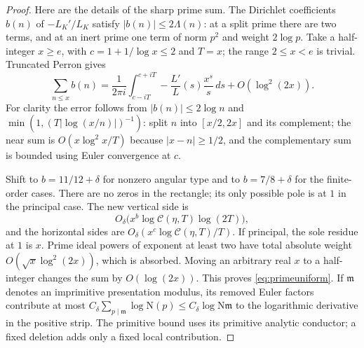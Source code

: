 \documentclass[11pt,a4paper]{article}
\numberwithin{equation}{section}
\theoremstyle{definition}
\theoremstyle{remark}
\newcommand{\N}{\mathrm N}
\newcommand{\dd}{\,d}
\begin{document}
\begin{proof}
Here are the details of the sharp prime sum. The Dirichlet coefficients $b(n)$ of $-L_K'/L_K$ satisfy $|b(n)|\le2\Lambda(n)$: at a split prime there are two terms, and at an inert prime one term of norm $p^2$ and weight $2\log p$. Take a half-integer $x\ge e$, with $c=1+1/\log x\le2$ and $T=x$; the range $2\le x<e$ is trivial. Truncated Perron gives
\[
 \sum_{n\le x}b(n)=\frac1{2\pi i}\int_{c-iT}^{c+iT}-\frac{L'}L(s)\frac{x^s}s\dd s+O(\log^2(2x)).
\]
For clarity the error follows from $|b(n)|\le2\log n$ and
$\min(1,(T|\log(x/n)|)^{-1})$: split $n$ into $[x/2,2x]$ and its complement; the near sum is $O(x\log^2x/T)$ because $|x-n|\ge1/2$, and the complementary sum is bounded using Euler convergence at $c$.

Shift to $b=11/12+\delta$ for nonzero angular type and to $b=7/8+\delta$ for the finite-order cases. There are no zeros in the rectangle; its only possible pole is at $1$ in the principal case. The new vertical side is
\[
 O_\delta\bigl(x^b\log\mathcal C(\eta,T)\log(2T)\bigr),
\]
and the horizontal sides are $O_\delta(x^c\log\mathcal C(\eta,T)/T)$. If principal, the sole residue at $1$ is $x$. Prime ideal powers of exponent at least two have total absolute weight $O(\sqrt x\log^2(2x))$, which is absorbed. Moving an arbitrary real $x$ to a half-integer changes the sum by $O(\log(2x))$. This proves \eqref{eq:primeuniform}. If $\mathfrak m$ denotes an imprimitive presentation modulus, its removed Euler factors contribute at most $C_\delta\sum_{p\mid\mathfrak m}\log\N(p)\le C_\delta\log\N\mathfrak m$ to the logarithmic derivative in the positive strip. The primitive bound uses its primitive analytic conductor; a fixed deletion adds only a fixed local contribution.
\end{proof}
\end{document}
